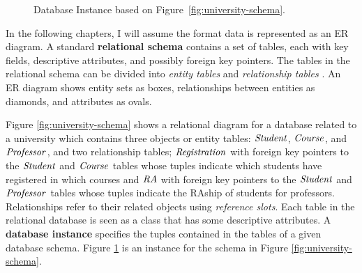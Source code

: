 \documentclass{sfuthesis}
\begin{document}
\begin{figure}[htbp] %
 \centering
{}
\caption{Database Instance based on Figure~\ref{fig:university-schema}.  
}
 \label{fig:university-tables}
\end{figure}
In the following chapters, I will assume the format data is represented as an ER diagram.
A standard \textbf{relational schema} contains a set of tables, each with key fields,  descriptive attributes, and possibly foreign key pointers.  The tables in the relational schema can be divided into {\em entity tables} and {\em relationship tables} \cite[Ch.2.2]{Ullman1982}. An ER diagram shows entity sets as boxes, relationships between entities as diamonds, and attributes as ovals.

Figure \ref{fig:university-schema} shows a relational diagram for a database related to a university which contains three objects or entity tables:  $\mathit{Student}$,  $\mathit{Course}$, and $\mathit{Professor}$, and two relationship tables; $\mathit{Registration}$ with foreign key pointers to the $\mathit{Student}$ and $\mathit{Course}$ tables whose tuples indicate which students have registered in which courses and $\mathit{RA}$ with foreign key pointers to the $\mathit{Student}$ and $\mathit{Professor}$ tables whose tuples indicate the RAship of students for professors. 
Relationships refer to their related objects using \textit{reference slots}. Each table in the relational database is seen as a class that has some descriptive attributes.
A \textbf{database instance} specifies the tuples contained in the tables of a given database schema. Figure \ref{fig:university-tables} is an instance for the schema in Figure \ref{fig:university-schema}.
\end{document}
